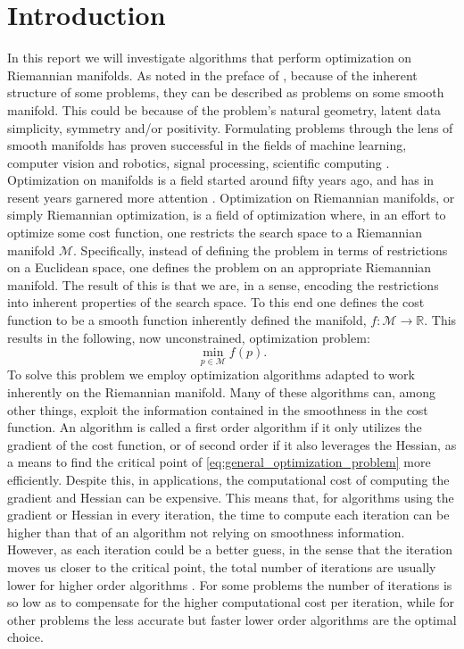 \section{Introduction}\label{sec:Introduction}

In this report we will investigate algorithms that perform optimization on Riemannian manifolds. As noted in the preface of \cite{Boumal2023}, because of the inherent structure of some problems, they can be described as problems on some smooth manifold. This could be because of the problem's natural geometry, latent data simplicity, symmetry and/or positivity. Formulating problems through the lens of smooth manifolds has proven successful in the fields of machine learning, computer vision and robotics, signal processing, scientific computing \cite{Boumal2023}. Optimization on manifolds is a field started around fifty years ago, and has in resent years garnered more attention \cite{Boumal2023}. Optimization on Riemannian manifolds, or simply Riemannian optimization, is a field of optimization where, in an effort to optimize some cost function, one restricts the search space to a Riemannian manifold $\mathcal{M}$. Specifically, instead of defining the problem in terms of restrictions on a Euclidean space, one defines the problem on an appropriate Riemannian manifold. The result of this is that we are, in a sense, encoding the restrictions into inherent properties of the search space. To this end one defines the cost function to be a smooth function inherently defined the manifold, $f\colon\mathcal{M}\to\mathbb{R}$. This results in the following, now unconstrained, optimization problem:
\begin{equation}\label{eq:general_optimization_problem}
    \min_{p\in\mathcal{M}}f(p).
\end{equation}
To solve this problem we employ optimization algorithms adapted to work inherently on the Riemannian manifold. Many of these algorithms can, among other things, exploit the information contained in the smoothness in the cost function. An algorithm is called a first order algorithm if it only utilizes the gradient of the cost function, or of second order if it also leverages the Hessian, as a means to find the critical point of \eqref{eq:general_optimization_problem} more efficiently. Despite this, in applications, the computational cost of computing the gradient and Hessian can be expensive. This means that, for algorithms using the gradient or Hessian in every iteration, the time to compute each iteration can be higher than that of an algorithm not relying on smoothness information. However, as each iteration could be a better guess, in the sense that the iteration moves us closer to the critical point, the total number of iterations are usually lower for higher order algorithms \cite[p.~119]{Boumal2023}. For some problems the number of iterations is so low as to compensate for the higher computational cost per iteration, while for other problems the less accurate but faster lower order algorithms are the optimal choice. 

